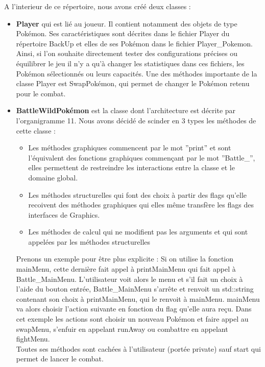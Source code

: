 A l'interieur de ce répertoire, nous avons créé deux classes :
\begin{itemize}
\item \textbf{Player} qui est lié au joueur. Il contient notamment des objets de type Pokémon. Ses caractéristiques sont décrites dans le fichier Player du répertoire BackUp et elles de ses Pokémon dans le fichier Player\_Pokemon. Ainsi, si l'on souhaite directement tester des configurations précises ou équilibrer le jeu il n'y a qu'à changer les statistiques dans ces fichiers, les Pokémon sélectionnés ou leurs capacités. Une des méthodes importante de la classe Player est SwapPokémon, qui permet de changer le Pokémon retenu pour le combat.

\item \textbf{BattleWildPokémon} est la classe dont l'architecture est décrite par l'organigramme 11. Nous avons décidé de scinder en 3 types les méthodes de cette classe :
\begin{itemize}
\item Les méthodes graphiques commencent par le mot ''print'' et sont l'équivalent des fonctions graphiques commençant par le mot ''Battle\_'', elles permettent de restreindre les interactions entre la classe et le domaine global.
\item Les méthodes structurelles qui font des choix à partir des flags qu'elle recoivent des méthodes graphiques qui elles même transfère les flags des interfaces de Graphics. 
\item Les méthodes de calcul qui ne modifient pas les arguments et qui sont appelées par les méthodes structurelles
\end{itemize}
Prenons un exemple pour être plus explicite : Si on utilise la fonction mainMenu, cette dernière fait appel à printMainMenu qui fait appel à Battle\_MainMenu. L'utilisateur voit alors le menu et s'il fait un choix à l'aide du bouton entrée, Battle\_MainMenu s'arrête et renvoit un std::string contenant son choix à printMainMenu, qui le renvoit à mainMenu. mainMenu va alors choisir l'action suivante en fonction du flag qu'elle aura reçu. Dans cet exemple les actions sont choisir un nouveau Pokémon et faire appel au swapMenu, s'enfuir en appelant runAway ou combattre en appelant fightMenu.\\

Toutes ses méthodes sont cachées à l'utilisateur (portée private) sauf start qui permet de lancer le combat. 
\end{itemize}
